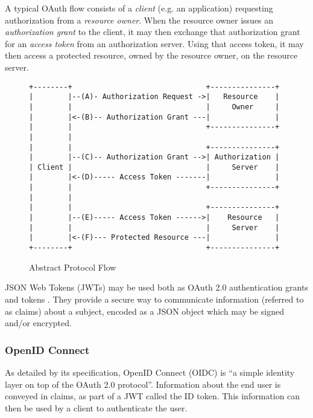A typical OAuth flow consists of a \emph{client} (e.g. an application) requesting authorization from a \emph{resource owner}. When the resource owner issues an \emph{authorization grant} to the client, it may then exchange that authorization grant for an \emph{access token} from an authorization server. Using that access token, it may then access a protected resource, owned by the resource owner, on the resource server. \autocite{Hardt2023}
\begin{figure}[h]
\begin{scriptsize}
\begin{verbatim} 
+--------+                               +---------------+
|        |--(A)- Authorization Request ->|   Resource    |
|        |                               |     Owner     |
|        |<-(B)-- Authorization Grant ---|               |
|        |                               +---------------+
|        |
|        |                               +---------------+
|        |--(C)-- Authorization Grant -->| Authorization |
| Client |                               |     Server    |
|        |<-(D)----- Access Token -------|               |
|        |                               +---------------+
|        |
|        |                               +---------------+
|        |--(E)----- Access Token ------>|    Resource   |
|        |                               |     Server    |
|        |<-(F)--- Protected Resource ---|               |
+--------+                               +---------------+
\end{verbatim}
\end{scriptsize}
\caption{Abstract Protocol Flow \autocite{Hardt2023}}
\end{figure}

JSON Web Tokens (JWTs) may be used both as OAuth 2.0 authentication grants and tokens \autocite{Jones2015a, Bertocci2021}. They provide a secure way to communicate information (referred to as claims) about a subject, encoded as a JSON object which may be signed and/or encrypted. \autocite{Jones2015}

\subsubsection{OpenID Connect}
As detailed by its specification, OpenID Connect (OIDC) is ``a simple identity layer on top of the OAuth 2.0 protocol''. Information about the end user is conveyed in claims, as part of a JWT called the ID token. This information can then be used by a client to authenticate the user. \autocite{Sakimura2014} 


